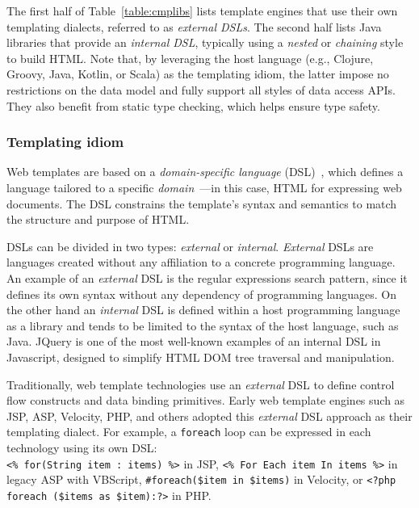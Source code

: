 The first half of Table~\ref{table:cmplibs} lists template engines that use their
own templating dialects, referred to as \textit{external DSLs}. The second half
lists Java libraries that provide an \textit{internal DSL}, typically using a
\textit{nested} or \textit{chaining} style to build HTML.
Note that, by leveraging the host language (e.g., Clojure, Groovy, Java, Kotlin,
or Scala) as the templating idiom, the latter impose no restrictions on the data
model and fully support all styles of data access APIs. They also benefit from
static type checking, which helps ensure type safety.


\subsubsection{Templating idiom}

Web templates are based on a \textit{domain-specific language}
(DSL)~\cite{landin1966next}, which defines a language tailored to a specific
\textit{domain}~\cite{evans2004domain}—in this case, HTML for expressing web
documents.
The DSL constrains the template's syntax and semantics to match the structure
and purpose of HTML.

DSLs can be divided in two types: \textit{external} or
\textit{internal}\cite{dslbook}.
\textit{External} DSLs are languages created without any affiliation to a
concrete programming language.
An example of an \textit{external} DSL is the regular expressions search
pattern\cite{thompson1968}, since it defines its own syntax without any
dependency of programming languages. 
On the other hand an \textit{internal} DSL is defined within a host programming
language as a library and tends to be limited to the syntax of the host language,
such as Java.
JQuery\cite{resig2007pro} is one of the most well-known examples of an internal
DSL in Javascript, designed to simplify HTML DOM\cite{dom} tree traversal and
manipulation.

Traditionally, web template technologies use an \textit{external} DSL to define
control flow constructs and data binding primitives. Early web template engines
such as JSP, ASP, Velocity, PHP, and others adopted this \textit{external} DSL
approach as their templating dialect.
For example, a \texttt{foreach} loop can be expressed in each technology using its 
own DSL:
\\\texttt{<\% for(String item : items) \%>} in JSP, \texttt{<\% For Each item 
In items \%>} in legacy ASP with VBScript, \texttt{\#foreach(\$item in \$items)} in 
Velocity, or \texttt{<?php foreach (\$items as \$item):?>} in PHP.

